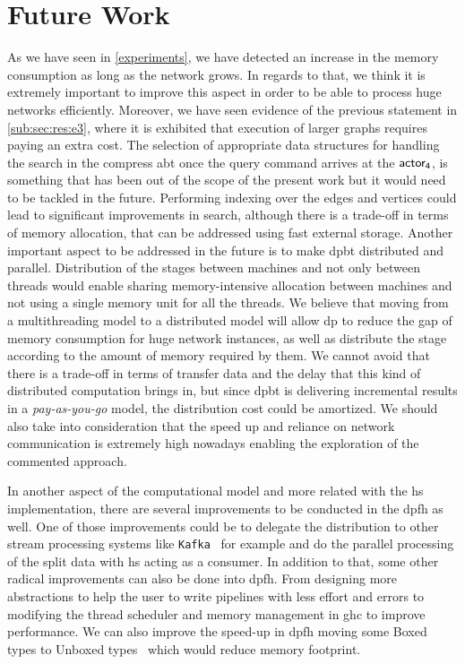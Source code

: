 \section{Future Work}
As we have seen in \autoref{experiments}, we have detected an increase in the memory consumption as long as the network grows. 
In regards to that, we think it is extremely important to improve this aspect in order to be able to process huge networks efficiently. 
Moreover, we have seen evidence of the previous statement in \autoref{sub:sec:res:e3}, where it is exhibited that execution of larger graphs requires paying an extra cost.
The selection of appropriate data structures for handling the search in the compress \acrlong{abt} once the query command arrives at the $\mathsf{actor_4}$, is something that has been out of the scope of the present work but it would need to be tackled in the future.
Performing indexing over the edges and vertices could lead to significant improvements in search, although there is a trade-off in terms of memory allocation, that can be addressed using fast external storage.
Another important aspect to be addressed in the future is to make \acrlong{dpbt} distributed and parallel. Distribution of the stages between machines and not only between threads would enable sharing memory-intensive allocation between machines and not using a single memory unit for all the threads.
We believe that moving from a multithreading model to a distributed model will allow \acrlong{dp} to reduce the gap of memory consumption for huge network instances, as well as distribute the stage according to the amount of memory required by them. 
We cannot avoid that there is a trade-off in terms of transfer data and the delay that this kind of distributed computation brings in, but since \acrlong{dpbt} is delivering incremental results in a \emph{pay-as-you-go} model, the distribution cost could be amortized. 
We should also take into consideration that the speed up and reliance on network communication is extremely high nowadays enabling the exploration of the commented approach.

In another aspect of the computational model and more related with the \acrlong{hs} implementation, there are several improvements to be conducted in the \acrlong{dpfh} as well. 
One of those improvements could be to delegate the distribution to other stream processing systems like \texttt{Kafka}~\cite{kafka} for example and do the parallel processing of the split data with \acrlong{hs} acting as a consumer.
In addition to that, some other radical improvements can also be done into \acrlong{dpfh}. From designing more abstractions to help the user to write pipelines with less effort and errors to modifying the thread scheduler and memory management in \acrshort{ghc} to improve performance. 
We can also improve the speed-up in \acrlong{dpfh} moving some Boxed types to Unboxed types~\cite{hs-unbox} which would reduce memory footprint.

